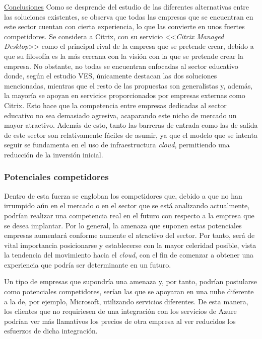 \noindent\underline{Conclusiones}\newline
\indent Como se desprende del estudio de las diferentes alternativas entre las soluciones existentes, se observa que todas las empresas que se encuentran en este sector cuentan con cierta experiencia, lo que las convierte en unos fuertes competidores. Se considera a Citrix, con su servicio <<\textit{Citrix Managed Desktop}>> como el principal rival de la empresa que se pretende crear, debido a que su filosofía es la más cercana con la visión con la que se pretende crear la empresa. No obstante, no todas se encuentran enfocadas al sector educativo donde, según el estudio \acs{VES}, únicamente destacan las dos soluciones mencionadas, mientras que el resto de las propuestas son generalistas y, además, la mayoría se apoyan en servicios proporcionados por empresas externas como Citrix. Esto hace que la competencia entre empresas dedicadas al sector educativo no sea demasiado agresiva, acaparando este nicho de mercado un mayor atractivo. Además de esto, tanto las barreras de entrada como las de salida de este sector son relativamente fáciles de asumir, ya que el modelo que se intenta seguir se fundamenta en el uso de infraestructura \textit{cloud}, permitiendo una reducción de la inversión inicial.

\clearpage


\subsubsection{Potenciales competidores}
Dentro de esta fuerza se engloban los competidores que, debido a que no han irrumpido aún en el mercado o en el sector que se está analizando actualmente, podrían realizar una competencia real en el futuro con respecto a la empresa que se desea implantar. Por lo general, la amenaza que suponen estas potenciales empresas aumentará conforme aumente el atractivo del sector. Por tanto, será de vital importancia posicionarse y establecerse con la mayor celeridad posible, vista la tendencia del movimiento hacia el \textit{cloud}, con el fin de comenzar a obtener una experiencia que podría ser determinante en un futuro.

Un tipo de empresas que supondría una amenaza y, por tanto, podrían postularse como potenciales competidores, serían las que se apoyaran en una nube diferente a la de, por ejemplo, Microsoft, utilizando servicios diferentes. De esta manera, los clientes que no requiriesen de una integración con los servicios de Azure podrían ver más llamativos los precios de otra empresa al ver reducidos los esfuerzos de dicha integración.

